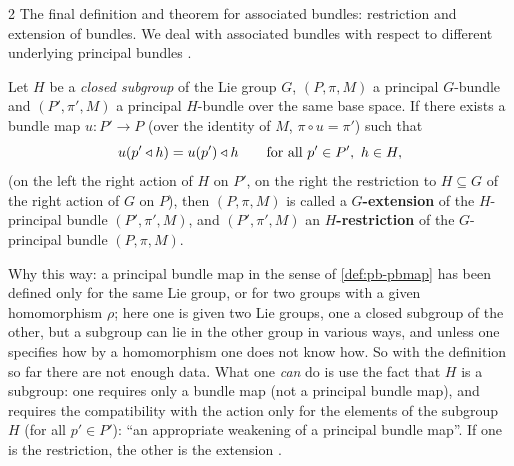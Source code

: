 \begin{paracol}{2}
The final definition and theorem for associated bundles: restriction and extension of bundles. We deal with associated bundles with respect to different underlying principal bundles   .
\begin{definition}\label{def:ab-restriction}
Let $H$ be a \emph{closed subgroup} of the Lie group $G$, $(P,\pi,M)$ a principal $G$-bundle and $(P',\pi',M)$ a principal $H$-bundle over the same base space. If there exists a bundle map $u\colon P'\to P$ (over the identity of $M$, $\pi\circ u=\pi'$) such that
\[
  u(p'\mathbin{\triangleleft} h)=u(p')\mathbin{\triangleleft} h\qquad\text{for all }p'\in P',\ h\in H ,
\]
(on the left the right action of $H$ on $P'$, on the right the restriction to $H\subseteq G$ of the right action of $G$ on $P$), then $(P,\pi,M)$ is called a \textbf{$G$-extension} of the $H$-principal bundle $(P',\pi',M)$, and $(P',\pi',M)$ an \textbf{$H$-restriction} of the $G$-principal bundle $(P,\pi,M)$.                 
\end{definition}
Why this way: a principal bundle map in the sense of \cref{def:pb-pbmap} has been defined only for the same Lie group, or for two groups with a given homomorphism $\rho$; here one is given two Lie groups, one a closed subgroup of the other, but a subgroup can lie in the other group in various ways, and unless one specifies how by a homomorphism one does not know how. So with the definition so far there are not enough data. What one \emph{can} do is use the fact that $H$ is a subgroup: one requires only a bundle map (not a principal bundle map), and requires the compatibility with the action only for the elements of the subgroup $H$ (for all $p'\in P'$): ``an appropriate weakening of a principal bundle map''. If one is the restriction, the other is the extension      .


\end{paracol}
